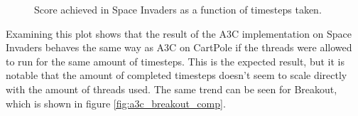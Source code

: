 \documentclass[11pt]{article}
\begin{document}
\begin{figure}[H]
    \caption{Score achieved in Space Invaders as a function of
    timesteps taken.}
    \label{fig:a3c_spaceinvaders_ts}
\end{figure}

Examining this plot shows that the result of the A3C implementation
on Space Invaders behaves the same way as A3C on CartPole if the threads
were allowed to run for the same amount of timesteps.
This is the expected result, but it is notable that the amount
of completed timesteps doesn't seem to scale directly with
the amount of threads used.
The same trend can be seen for Breakout, which is shown in figure
\ref{fig:a3c_breakout_comp}.
\end{document}
